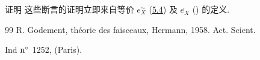 \begin{enonce*}[remark]{证明}
这些断言的证明立即来自等价 $e^{\sim}_X$ (\hyperref[III.prop5.4]{5.4})
及 $e^{\widehat{\phantom{\,}}}_X$ () 的定义.
\end{enonce*}

\begin{thebibliography}{99}%
 R. Godement, théorie des faisceaux, Hermann,
1958. Act. Scient.

Ind ${\rm n^{\circ}}$ 1252, (Paris).
\end{thebibliography}



\ifx\danslelivre\undefined

\fi



